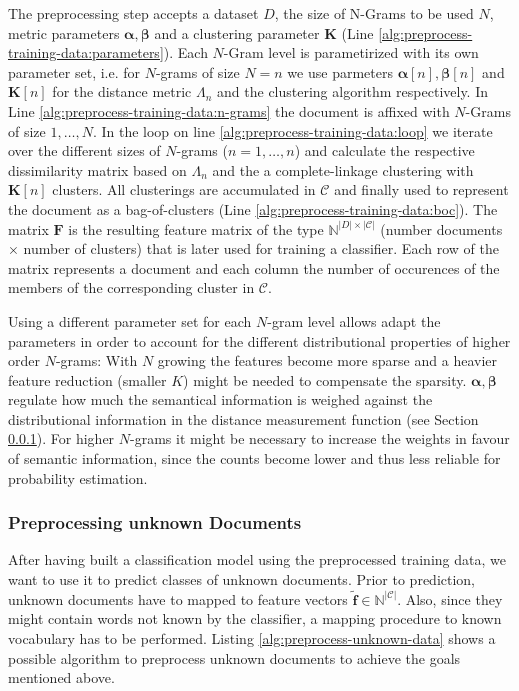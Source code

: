 The preprocessing step accepts a dataset $D$, the size of N-Grams to be used
$N$, metric parameters $\boldsymbol \alpha, \boldsymbol \beta$ and a clustering
parameter $\boldsymbol K$ (Line \ref{alg:preprocess-training-data:parameters}).
Each $N$-Gram level is parametirized with its own parameter set, i.e. for
$N$-grams of size $N=n$ we use parmeters $\boldsymbol\alpha[n],
\boldsymbol\beta[n]$ and $\boldsymbol K[n]$ for the distance metric $\Lambda_n$
and the clustering algorithm respectively. In Line
\ref{alg:preprocess-training-data:n-grams} the document is affixed with
$N$-Grams of size $1,\ldots,N$. In the loop on line
\ref{alg:preprocess-training-data:loop} we iterate over the different
sizes of $N$-grams ($n=1,\ldots,n$) and calculate the respective dissimilarity
matrix based on $\Lambda_n$ and the a complete-linkage clustering with $\boldsymbol K[n]$ clusters. 
All clusterings are accumulated in $\mathcal{C}$ and finally used to represent
the document as a bag-of-clusters (Line \ref{alg:preprocess-training-data:boc}). The matrix
$\mathbf{F}$ is the resulting feature matrix of the type
$\mathbb{N}^{|D|\times|\mathcal{C}|}$ (number documents $\times$ number of clusters) that is later used for training a
classifier. Each row of the matrix represents a document and each column the
number of occurences of the members of the corresponding cluster in
$\mathcal{C}$.

Using a different parameter set for each $N$-gram level allows adapt the
parameters in order to account for the different distributional properties of
higher order $N$-grams: With $N$ growing the features become more sparse and a
heavier feature reduction (smaller $K$) might be needed to compensate the
sparsity. $\boldsymbol \alpha, \boldsymbol \beta$ regulate how much
the semantical information is weighed against the distributional information in
the distance measurement function (see Section \ref{}). For higher $N$-grams it
might be necessary to increase the weights in favour of semantic information, since the counts
become lower and thus less reliable for probability estimation. 

\subsubsection{Preprocessing unknown Documents}

After having built a classification model using the preprocessed training data,
we want to use it to predict classes of unknown documents. Prior to prediction,
unknown documents have to mapped to feature vectors $\mathbf{\tilde{f}} \in
\mathbb{N}^{|\mathcal{C}|}$. Also, since they might contain words not known by
the classifier, a mapping procedure to known vocabulary has to be performed. Listing
\ref{alg:preprocess-unknown-data} shows a possible algorithm to preprocess
unknown documents to achieve the goals mentioned above.

